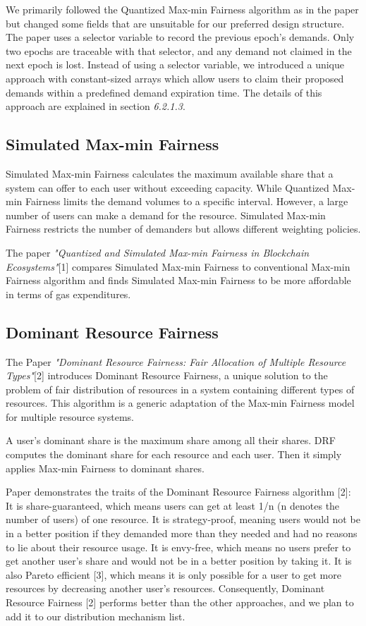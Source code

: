 \documentclass[a4paper,12pt]{report}
\begin{document}
We primarily followed the Quantized Max-min Fairness algorithm as in the paper but changed some fields that are unsuitable for our preferred design structure. The paper uses a selector variable to record the previous epoch's demands. Only two epochs are traceable with that selector, and any demand not claimed in the next epoch is lost. Instead of using a selector variable, we introduced a unique approach with constant-sized arrays which allow users to claim their proposed demands within a predefined demand expiration time. The details of this approach are explained in section \textit{6.2.1.3}.

\subsection{Simulated Max-min Fairness}
Simulated Max-min Fairness calculates the maximum available share that a system can offer to each user without exceeding capacity.
\newpage
While Quantized Max-min Fairness limits the demand volumes to a specific interval. However, a large number of users can make a demand for the resource. Simulated Max-min Fairness restricts the number of demanders but allows different weighting policies. 

The paper  \textit{"Quantized and Simulated Max-min Fairness in Blockchain Ecosystems"}[1]  compares Simulated Max-min Fairness to conventional Max-min Fairness algorithm and finds Simulated Max-min Fairness to be more affordable in terms of gas expenditures. 

\subsection{Dominant Resource Fairness}
The Paper \textit{"Dominant Resource Fairness: Fair Allocation of Multiple Resource Types"}[2] introduces Dominant Resource Fairness, a unique solution to the problem of fair distribution of resources in a system containing different types of resources. This algorithm is a generic adaptation of the Max-min Fairness model for multiple resource systems. 

A user's dominant share is the maximum share among all their shares. DRF computes the dominant share for each resource and each user. Then it simply applies Max-min Fairness to dominant shares. 

Paper demonstrates the traits of the Dominant Resource Fairness algorithm [2]: It is share-guaranteed, which means users can get at least 1/n (n denotes the number of users) of one resource. It is strategy-proof, meaning users would not be in a better position if they demanded more than they needed and had no reasons to lie about their resource usage. It is envy-free, which means no users prefer to get another user's share and would not be in a better position by taking it. It is also Pareto efficient [3], which means it is only possible for a user to get more resources by decreasing another user's resources.
Consequently, Dominant Resource Fairness [2] performs better than the other approaches, and we plan to add it to our distribution mechanism list.
\end{document}
